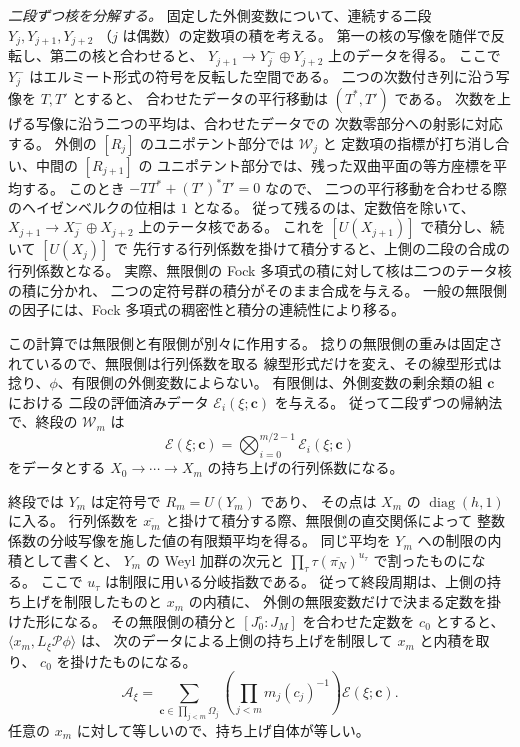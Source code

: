 \emph{二段ずつ核を分解する。}
固定した外側変数について、連続する二段 \(Y_j,Y_{j+1},Y_{j+2}\)
（\(j\) は偶数）の定数項の積を考える。
第一の核の写像を随伴で反転し、第二の核と合わせると、
\(Y_{j+1}\to Y_j^{-}\oplus Y_{j+2}\) 上のデータを得る。
ここで \(Y_j^{-}\) はエルミート形式の符号を反転した空間である。
二つの次数付き列に沿う写像を \(T,T'\) とすると、
合わせたデータの平行移動は \((T^\ast,T')\) である。
次数を上げる写像に沿う二つの平均は、合わせたデータでの
次数零部分への射影に対応する。
外側の \([R_j]\) のユニポテント部分では \(\mathcal W_j\) と
定数項の指標が打ち消し合い、中間の \([R_{j+1}]\) の
ユニポテント部分では、残った双曲平面の等方座標を平均する。
このとき \(-TT^\ast+(T')^\ast T'=0\) なので、
二つの平行移動を合わせる際のヘイゼンベルクの位相は \(1\) となる。
従って残るのは、定数倍を除いて、
\(X_{j+1}\to X_j^{-}\oplus X_{j+2}\) 上のテータ核である。
これを \([U(X_{j+1})]\) で積分し、続いて \([U(X_j)]\) で
先行する行列係数を掛けて積分すると、上側の二段の合成の行列係数となる。
実際、無限側の Fock 多項式の積に対して核は二つのテータ核の積に分かれ、
二つの定符号群の積分がそのまま合成を与える。
一般の無限側の因子には、Fock 多項式の稠密性と積分の連続性により移る。

この計算では無限側と有限側が別々に作用する。
捻りの無限側の重みは固定されているので、無限側は行列係数を取る
線型形式だけを変え、その線型形式は捻り、\(\phi\)、有限側の外側変数によらない。
有限側は、外側変数の剰余類の組 \(\boldsymbol c\) における
二段の評価済みデータ \(\mathcal E_i(\xi;\boldsymbol c)\) を与える。
従って二段ずつの帰納法で、終段の \(\mathcal W_m\) は
\[
  \mathcal E(\xi;\boldsymbol c)
  =\bigotimes_{i=0}^{m/2-1}\mathcal E_i(\xi;\boldsymbol c)
\]
をデータとする \(X_0\to\cdots\to X_m\) の持ち上げの行列係数になる。

終段では \(Y_m\) は定符号で \(R_m=U(Y_m)\) であり、
その点は \(X_m\) の \(\operatorname{diag}(h,1)\) に入る。
行列係数を \(\overline{x_m}\) と掛けて積分する際、無限側の直交関係によって
整数係数の分岐写像を施した値の有限類平均を得る。
同じ平均を \(Y_m\) への制限の内積として書くと、
\(Y_m\) の Weyl 加群の次元と
\(\prod_\tau\tau(\overline{\pi_N})^{u_\tau}\) で割ったものになる。
ここで \(u_\tau\) は制限に用いる分岐指数である。
従って終段周期は、上側の持ち上げを制限したものと \(x_m\) の内積に、
外側の無限変数だけで決まる定数を掛けた形になる。
その無限側の積分と \([J^\circ_0:J_M]\) を合わせた定数を \(c_0\) とすると、
\(\langle x_m,L_\xi\mathcal P\phi\rangle\) は、
次のデータによる上側の持ち上げを制限して \(x_m\) と内積を取り、
\(c_0\) を掛けたものになる。
\[
 \mathcal A_\xi
   =\sum_{\boldsymbol c\in\prod_{j<m}\Omega_j}
         \left(\prod_{j<m}m_j(c_j)^{-1}\right)\mathcal E(\xi;\boldsymbol c).
\]
任意の \(x_m\) に対して等しいので、持ち上げ自体が等しい。

